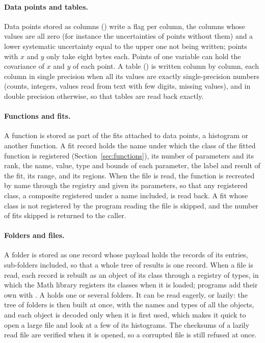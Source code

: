 \paragraph{Data points and tables.}
Data points stored as columns () write a flag per column, the columns whose values are all zero
(for instance the uncertainties of points without them) and a lower systematic uncertainty equal to the upper one not
being written; points with $x$ and $y$ only take eight bytes each. Points of one variable can hold the covariance of
$x$ and $y$ of each point. A table () is written column by column, each column in single precision when
all its values are exactly single-precision numbers (counts, integers, values read from text with few digits, missing
values), and in double precision otherwise, so that tables are read back exactly.

\paragraph{Functions and fits.}
A function is stored as part of the fits attached to data points, a histogram or another function. A fit record holds
the name under which the class of the fitted function is registered (Section~\ref{sec:functions}), its number of
parameters and its rank, the name, value, type and bounds of each parameter, the label and result of the fit, its
range, and its regions. When the file is read, the function is recreated by name through the registry and given its
parameters, so that any registered class, a composite registered under a name included, is read back. A fit whose
class is not registered by the program reading the file is skipped, and the number of fits skipped is returned to
the caller.

\paragraph{Folders and files.}
A folder is stored as one  record whose payload holds the records of its entries, sub-folders included,
so that a whole tree of results is one record. When a file is read, each record is rebuilt as an object of its
class through a registry of types, in which the Math library registers its classes when it is loaded; programs add
their own with . A  holds one or several folders. It can be read eagerly,
or lazily: the tree of folders is then built at once, with the names and types of all the objects, and each object is
decoded only when it is first used, which makes it quick to open a large file and look at a few of its histograms.
The checksums of a lazily read file are verified when it is opened, so a corrupted file is still refused at once.

